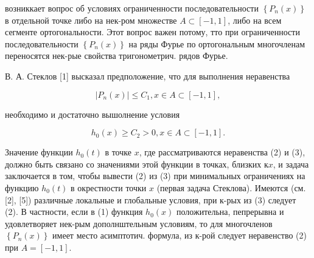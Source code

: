 \documentclass[10pt]{article}
\begin{document}
возниккает вопрос об условиях ограниченности последовательности $\left\{P_{n}(x)\right\}$ в отдельной точке либо на нек-ром множестве $A \subset[-1,1]$, либо на всем сегменте ортогональности. Этот вопрос важен потому, тто при ограниченности последовательности $\left\{P_{n}(x)\right\}$ на ряды Фурье по ортогональным многочленам переносятся нек-рые свойства тригонометрич. рядов Фурье.



В. А. Стеклов [1] высказал предположение, что для выполнения неравенства



\[

\left|P_{n}(x)\right| \leqslant C_{1}, x \in A \subset[-1,1],

\]



необходимо и достаточно вышолнение условия



\[

h_{0}(x) \geqslant C_{2}>0, x \in A \subset[-1,1] .

\]



Значение функции $h_{0}(t)$ в точке $x$, где рассматриваются неравенства (2) и (3), должно быть связано со значениями этой функции в точках, близких $к x$, и задача заключается в том, чтобы вывести (2) из (3) при минимальных ограничениях на функцию $h_{0}(t)$ в окрестности точки $x$ (первая задача Стеклова). Имеются (см. [2], [5]) различные локальные и глобальные условия, при к-рых из (3) следует (2). В частности, если в (1) функция $h_{0}(x)$ положительна, пепрерывна и удовлетворяет нек-рым дополнштельным условиям, то для многочленов $\left\{P_{n}(x)\right\}$ имеет место асимптотич. формула, из к-рой следует неравенство (2) при $A=[-1,1]$.
\end{document}
